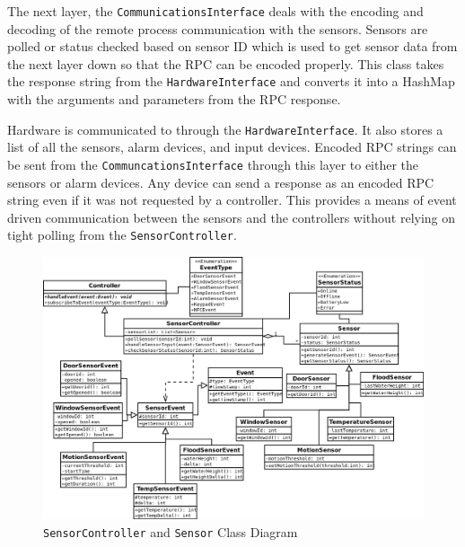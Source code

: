 \documentclass{report}
\begin{document}
The next layer, the \texttt{CommunicationsInterface} deals with the encoding
and decoding of the remote process communication with the sensors. Sensors are
polled or status checked based on sensor ID which is used to get sensor data
from the next layer down so that the RPC can be encoded properly. This class
takes the response string from the \texttt{HardwareInterface} and converts it
into a HashMap with the arguments and parameters from the RPC response.

Hardware is communicated to through the \texttt{HardwareInterface}. It also
stores a list of all the sensors, alarm devices, and input devices. Encoded RPC
strings can be sent from the \texttt{CommuncationsInterface} through this layer
to either the sensors or alarm devices. Any device can send a response as an
encoded RPC string even if it was not requested by a controller. This provides
a means of event driven communication between the sensors and the controllers
without relying on tight polling from the \texttt{SensorController}.
\begin{landscape} 
\begin{figure}[p]
    \caption{\texttt{SensorController} and \texttt{Sensor} Class Diagram}
    \label{fig:sensor_controller_class_diagram}
    \includegraphics[scale=0.5]{sensor_controller_class_diagram.png}
\end{figure}
\end{landscape} 
\end{document}

